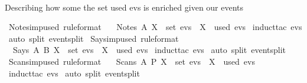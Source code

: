\begin{isabellebody}
  \ \ {\isacharparenright}{\isachardoublequoteclose}%
  \begin{isamarkuptext}%
  Describing how some the set used evs is enriched given our events%
  \end{isamarkuptext}\isamarkuptrue%
  \isamarkupfalse%
  \ Notes{\isacharunderscore}imp{\isacharunderscore}used\ {\isacharbrackleft}rule{\isacharunderscore}format{\isacharbrackright}\ {\isacharcolon}\isanewline
  \ \ {\isachardoublequoteopen}Notes\ A\ X\ {\isasymin}\ set\ evs\ {\isasymlongrightarrow}\ X\ {\isasymin}\ used\ evs{\isachardoublequoteclose}\isanewline
  \isadelimproof
  \endisadelimproof
  \isatagproof
  \isamarkupfalse%
  \ {\isacharparenleft}induct{\isacharunderscore}tac\ evs{\isacharparenright}\isanewline
  \isamarkupfalse%
  \ {\isacharparenleft}auto\ split{\isacharcolon}\ event{\isachardot}split{\isacharparenright}\isanewline
  \isamarkupfalse%
  \endisatagproof
  {\isafoldproof}%
  \isadelimproof
  \isanewline
  \endisadelimproof
  \isanewline
  \isamarkupfalse%
  \ Says{\isacharunderscore}imp{\isacharunderscore}used\ {\isacharbrackleft}rule{\isacharunderscore}format{\isacharbrackright}\ {\isacharcolon}\isanewline
  \ \ {\isachardoublequoteopen}Says\ A\ B\ X\ {\isasymin}\ set\ evs\ {\isasymlongrightarrow}\ X\ {\isasymin}\ used\ evs{\isachardoublequoteclose}\isanewline
  \isadelimproof
  \endisadelimproof
  \isatagproof
  \isamarkupfalse%
  \ {\isacharparenleft}induct{\isacharunderscore}tac\ evs{\isacharparenright}\isanewline
  \isamarkupfalse%
  \ {\isacharparenleft}auto\ split{\isacharcolon}\ event{\isachardot}split{\isacharparenright}\isanewline
  \isamarkupfalse%
  \endisatagproof
  {\isafoldproof}%
  \isadelimproof
  \isanewline
  \endisadelimproof
  \isanewline
  \isamarkupfalse%
  \ Scans{\isacharunderscore}imp{\isacharunderscore}used\ {\isacharbrackleft}rule{\isacharunderscore}format{\isacharbrackright}\ {\isacharcolon}\isanewline
  \ \ {\isachardoublequoteopen}Scans\ A\ P\ X\ {\isasymin}\ set\ evs\ {\isasymlongrightarrow}\ X\ {\isasymin}\ used\ evs{\isachardoublequoteclose}\isanewline
  \isadelimproof
  \endisadelimproof
  \isatagproof
  \isamarkupfalse%
  \ {\isacharparenleft}induct{\isacharunderscore}tac\ evs{\isacharparenright}\isanewline
  \isamarkupfalse%
  \ {\isacharparenleft}auto\ split{\isacharcolon}\ event{\isachardot}split{\isacharparenright}\isanewline

\end{isabellebody}
